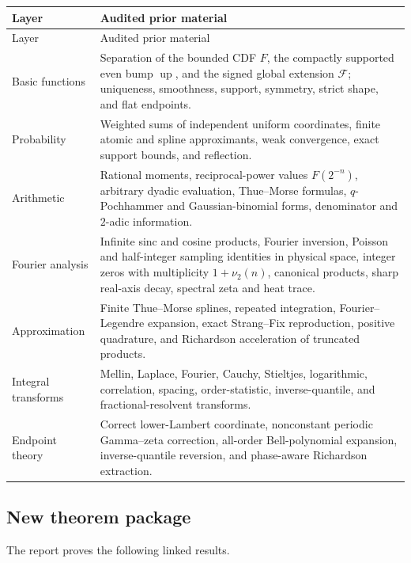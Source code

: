 \documentclass[11pt,oneside]{article}
\theoremstyle{definition}
\theoremstyle{remark}
\newcommand{\Up}{\operatorname{up}}
\newcommand{\vtwo}{\nu_2}
\newcommand{\1}{\mathbf 1}
\begin{document}
\begin{longtable}{@{}p{}p{}@{}}
\toprule
Layer & Audited prior material \\
\midrule
\endfirsthead
\toprule
Layer & Audited prior material \\
\midrule
\endhead
Basic functions & Separation of the bounded CDF $F$, the compactly supported even bump $\Up$, and the signed global extension $\mathcal F$; uniqueness, smoothness, support, symmetry, strict shape, and flat endpoints.\\
Probability & Weighted sums of independent uniform coordinates, finite atomic and spline approximants, weak convergence, exact support bounds, and reflection.\\
Arithmetic & Rational moments, reciprocal-power values $F(2^{-n})$, arbitrary dyadic evaluation, Thue--Morse formulas, $q$-Pochhammer and Gaussian-binomial forms, denominator and $2$-adic information.\\
Fourier analysis & Infinite sinc and cosine products, Fourier inversion, Poisson and half-integer sampling identities in physical space, integer zeros with multiplicity $1+\vtwo(n)$, canonical products, sharp real-axis decay, spectral zeta and heat trace.\\
Approximation & Finite Thue--Morse splines, repeated integration, Fourier--Legendre expansion, exact Strang--Fix reproduction, positive quadrature, and Richardson acceleration of truncated products.\\
Integral transforms & Mellin, Laplace, Fourier, Cauchy, Stieltjes, logarithmic, correlation, spacing, order-statistic, inverse-quantile, and fractional-resolvent transforms.\\
Endpoint theory & Correct lower-Lambert coordinate, nonconstant periodic Gamma--zeta correction, all-order Bell-polynomial expansion, inverse-quantile reversion, and phase-aware Richardson extraction.\\
\bottomrule
\end{longtable}

\subsection{New theorem package}

The report proves the following linked results.
\end{document}
